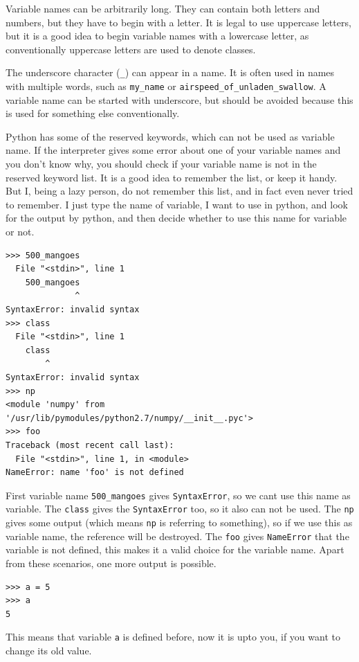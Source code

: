 \documentclass[10pt]{book}
\begin{document}
{Variable names can be arbitrarily long.  They can contain both letters and numbers, but they have to begin with a letter.
It is legal to use uppercase letters, but it is a good idea to begin variable names with a lowercase letter, as conventionally uppercase letters are used to denote classes. 

The underscore character (\verb"_") can appear in a name. It is often used in names with multiple words, such as
\verb"my_name" or \verb"airspeed_of_unladen_swallow". A variable name can be started with underscore, but should be avoided because this is used for something else conventionally. 

Python has some of the reserved keywords, which can not be used as variable name. If the interpreter gives some error about one of your variable names and you don't know why, you should check if your variable name is not in the reserved keyword list. It is a good idea to remember the list, or keep it handy. But I, being a lazy person, do not remember this list, and in fact even never tried to remember. I just type the name of variable, I want to use in python, and look for the output by python, and then decide whether to use this name for variable or not.

\beforeverb
\begin{verbatim}
>>> 500_mangoes 
  File "<stdin>", line 1
    500_mangoes 
              ^
SyntaxError: invalid syntax
>>> class
  File "<stdin>", line 1
    class
        ^
SyntaxError: invalid syntax
>>> np
<module 'numpy' from '/usr/lib/pymodules/python2.7/numpy/__init__.pyc'>
>>> foo
Traceback (most recent call last):
  File "<stdin>", line 1, in <module>
NameError: name 'foo' is not defined
\end{verbatim}
\afterverb
First variable name \verb"500_mangoes" gives \verb"SyntaxError", so we cant use this name as variable. The \verb"class" gives the \verb"SyntaxError" too, so it also can not be used. The \verb"np" gives some output (which means \verb"np" is referring to something), so if we use this as variable name, the reference will be destroyed. The \verb"foo" gives \verb"NameError" that the variable is not defined, this makes it a valid choice for the variable name. Apart from these scenarios, one more output is possible. 
\beforeverb
\begin{verbatim}
>>> a = 5
>>> a
5
\end{verbatim}
\afterverb
This means that variable \verb"a" is defined before, now it is upto you, if you want to change its old value.

}
\end{document}
